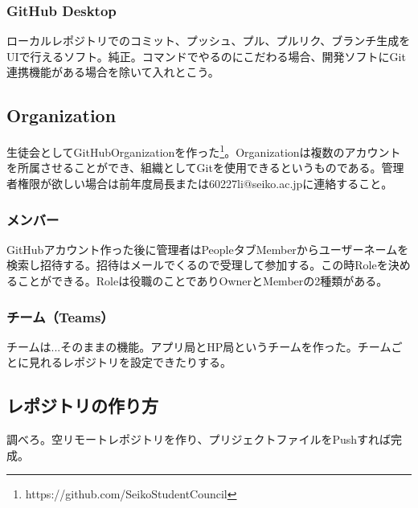 \documentclass[a4paper]{ltjsreport}
\begin{document}
\subsubsection{GitHub Desktop}
ローカルレポジトリでのコミット、プッシュ、プル、プルリク、ブランチ生成をUIで行えるソフト。純正。コマンドでやるのにこだわる場合、開発ソフトにGit連携機能がある場合を除いて入れとこう。
\subsection{Organization}
生徒会としてGitHubOrganizationを作った\footnote{https://github.com/SeikoStudentCouncil}。Organizationは複数のアカウントを所属させることができ、組織としてGitを使用できるというものである。管理者権限が欲しい場合は前年度局長または60227li@seiko.ac.jpに連絡すること。
\subsubsection{メンバー}
GitHubアカウント作った後に管理者はPeopleタブ\>Memberからユーザーネームを検索し招待する。招待はメールでくるので受理して参加する。この時Roleを決めることができる。Roleは役職のことでありOwnerとMemberの2種類がある。
\subsubsection{チーム（Teams）}
チームは...そのままの機能。アプリ局とHP局というチームを作った。チームごとに見れるレポジトリを設定できたりする。
\subsection{レポジトリの作り方}
調べろ。空リモートレポジトリを作り、プリジェクトファイルをPushすれば完成。
\end{document}
